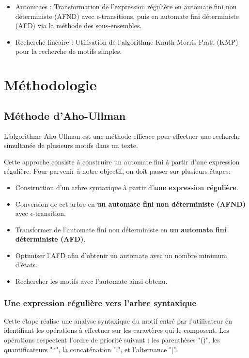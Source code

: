\documentclass{article}
\begin{document}
\begin{itemize}
    \item Automates : Transformation de l'expression régulière en automate fini non déterministe (AFND) avec $\epsilon$-transitions, puis en automate fini déterministe (AFD) via la méthode des sous-ensembles.
    \item Recherche linéaire : Utilisation de l'algorithme Knuth-Morris-Pratt (KMP) pour la recherche de motifs simples.
\end{itemize}

\section{Méthodologie}
\subsection{Méthode d’Aho-Ullman}
L’algorithme Aho-Ullman est une méthode efficace pour effectuer  une recherche simultanée de plusieurs  motifs dans un texte.

Cette approche consiste à construire un automate fini à partir d’une expression régulière. Pour parvenir à notre objectif, on doit passer sur plusieurs étapes:
\begin{itemize}
    \item Construction d'un arbre syntaxique à partir d’\textbf{une expression régulière}.
    \item Conversion de cet arbre en \textbf{un automate fini non déterministe (AFND)} avec $\epsilon$-transition.
    \item Transformer de l’automate fini non déterministe en \textbf{un automate fini déterministe (AFD)}.
    \item Optimiser l’AFD afin d’obtenir un automate avec un nombre minimum d’états.
    \item Rechercher les motifs avec l’automate ainsi obtenu.
\end{itemize}

\subsubsection{Une expression régulière vers l’arbre syntaxique}
Cette étape réalise une analyse syntaxique du motif entré par l'utilisateur en identifiant les opérations à effectuer sur les caractères qui le composent. Les opérations respectent l'ordre de priorité suivant : les parenthèses "()", les quantificateurs "*", la concaténation ".", et l'alternance "|".
\end{document}
